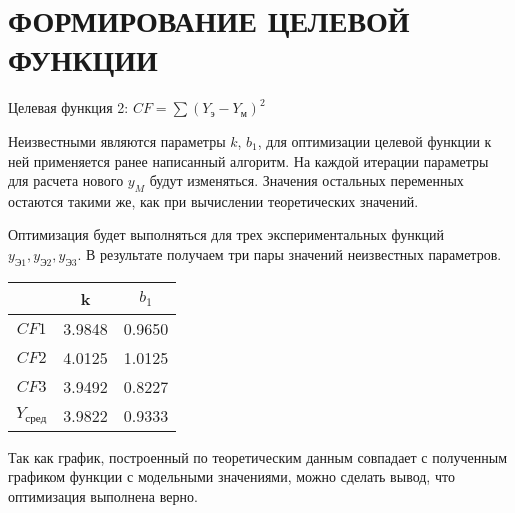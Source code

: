 \part{ФОРМИРОВАНИЕ ЦЕЛЕВОЙ ФУНКЦИИ}
    \begin{center}
        Целевая функция 2: $CF=\sum(Y_{\text{э}} - Y_{\text{м}})^2$
    \end{center}

    Неизвестными являются параметры $k$, $b_1$, для оптимизации целевой функции к ней применяется ранее написанный алгоритм. На каждой итерации параметры для расчета нового $y_M$ будут изменяться. Значения остальных переменных остаются такими же, как при вычислении теоретических значений.

    Оптимизация будет выполняться для трех экспериментальных функций $y_{\text{Э1}}, y_{\text{Э2}}, y_{\text{Э3}}$. В результате получаем три пары значений неизвестных параметров.

    \begin{center}
        \begin{tabular}{c|c|c|}
        \cline{2-3}
                                    & k    & $b_1$  \\ \hline
        \multicolumn{1}{|c|}{$CF1$} & 3.9848 & 0.9650 \\ \hline
        \multicolumn{1}{|c|}{$CF2$} & 4.0125 & 1.0125 \\ \hline
        \multicolumn{1}{|c|}{$CF3$} & 3.9492 & 0.8227  \\ \hline
        \multicolumn{1}{|c|}{$Y_{\text{сред}}$} & 3.9822  & 0.9333   \\ \hline
        \end{tabular}
    \end{center}

    \begin{center}
    \end{center}

    Так как график, построенный по теоретическим данным совпадает с полученным графиком функции с модельными значениями, можно сделать вывод, что оптимизация выполнена верно.
